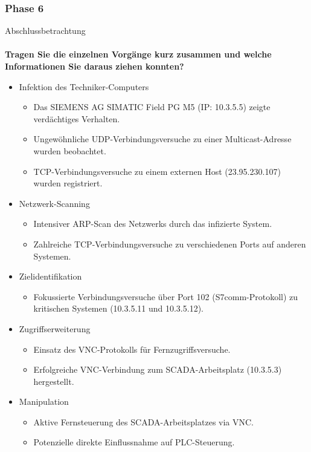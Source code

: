 \documentclass[
    a4paper,
    pagesize,
	pdftex,
    12pt,
]{scrartcl}
\begin{document}
\subsubsection{Phase 6}
Abschlussbetrachtung
\\ \\
\textbf{Tragen Sie die einzelnen Vorgänge kurz zusammen und welche Informationen Sie daraus ziehen konnten?}
\\
\begin{itemize}
    \item Infektion des Techniker-Computers
    \begin{itemize}
        \item Das SIEMENS AG SIMATIC Field PG M5 (IP: 10.3.5.5) zeigte verdächtiges Verhalten.
        \item Ungewöhnliche UDP-Verbindungsversuche zu einer Multicast-Adresse wurden beobachtet.
        \item TCP-Verbindungsversuche zu einem externen Host (23.95.230.107) wurden registriert.
    \end{itemize}
    \item Netzwerk-Scanning
    \begin{itemize}
        \item Intensiver ARP-Scan des Netzwerks durch das infizierte System.
        \item Zahlreiche TCP-Verbindungsversuche zu verschiedenen Ports auf anderen Systemen.
    \end{itemize}
    \item Zielidentifikation
    \begin{itemize}
        \item Fokussierte Verbindungsversuche über Port 102 (S7comm-Protokoll) zu kritischen Systemen (10.3.5.11 und 10.3.5.12).
    \end{itemize}
    \item Zugriffserweiterung
    \begin{itemize}
        \item Einsatz des VNC-Protokolls für Fernzugriffsversuche.
        \item Erfolgreiche VNC-Verbindung zum SCADA-Arbeitsplatz (10.3.5.3) hergestellt.
    \end{itemize}
    \item Manipulation
    \begin{itemize}
        \item Aktive Fernsteuerung des SCADA-Arbeitsplatzes via VNC.
        \item Potenzielle direkte Einflussnahme auf PLC-Steuerung.
    \end{itemize}
\end{itemize}
\end{document}
